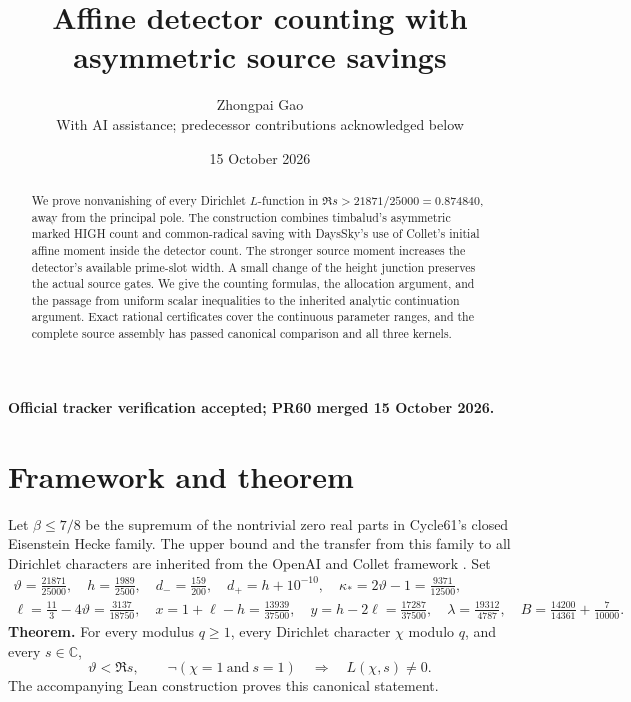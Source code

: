 \documentclass[10pt,a4paper]{article}
\title{Affine detector counting with asymmetric source savings}
\author{Zhongpai Gao\\\small With AI assistance; predecessor contributions acknowledged below}
\date{15 October 2026}
\newcommand{\tht}{\vartheta}
\begin{document}
\maketitle
\vspace{-2.5em}
\begin{center}\small\textbf{Official tracker verification accepted; PR60 merged 15 October 2026.}\end{center}
\begin{abstract}
We prove nonvanishing of every Dirichlet
$L$-function in $\Re s>21871/25000=0.874840$, away from the principal pole.
The construction combines timbalud's asymmetric marked HIGH count and
common-radical saving with DaysSky's use of Collet's initial affine moment
inside the detector count. The stronger source moment increases the detector's
available prime-slot width. A small change of the height junction preserves
the actual source gates. We give the counting formulas, the allocation
argument, and the passage from uniform scalar inequalities to the inherited
analytic continuation argument. Exact rational certificates cover the continuous parameter ranges, and the
complete source assembly has passed canonical comparison and all three kernels.
\end{abstract}

\section{Framework and theorem}
Let $\beta\leq7/8$ be the supremum of the nontrivial zero real parts in
Cycle61's closed Eisenstein Hecke family. The upper bound and the transfer from
this family to all Dirichlet characters are inherited from the OpenAI and
Collet framework \cite{collet,openai}. Set
\begin{gather}
 \tht=\frac{21871}{25000},\quad h=\frac{1989}{2500},\quad
 d_-=\frac{159}{200},\quad d_+=h+10^{-10},\quad
 \kappa_*=2\tht-1=\frac{9371}{12500},\label{parameters}\\
 \ell=\frac{11}{3}-4\tht=\frac{3137}{18750},\quad
 x=1+\ell-h=\frac{13939}{37500},\quad
 y=h-2\ell=\frac{17287}{37500},\quad
 \lambda=\frac{19312}{4787},\quad
 B=\frac{14200}{14361}+\frac7{10000}.\nonumber
\end{gather}
\textbf{Theorem.} For every modulus $q\geq1$, every Dirichlet character
$\chi$ modulo $q$, and every $s\in\mathbb C$,
\[
 \tht<\Re s,\qquad \neg(\chi=1\ \text{and}\ s=1)
 \quad\Longrightarrow\quad L(\chi,s)\ne0.
\]
The accompanying Lean construction proves this canonical statement.
\end{document}
